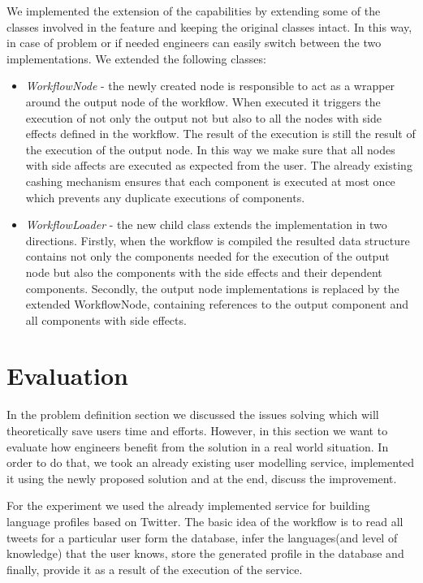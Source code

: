 We implemented the extension of the capabilities by extending some of the classes involved in the feature and keeping the original classes intact. In this way, in case of problem or if needed engineers can easily switch between the two implementations. We extended the following classes:

\begin{itemize}
	\item \textit{WorkflowNode} - the newly created node is responsible to act as a wrapper around the output node of the workflow. When executed it triggers the execution of not only the output not but also to all the nodes with side effects defined in the workflow. The result of the execution is still the result of the execution of the output node. In this way we make sure that all nodes with side affects are executed as expected from the user. The already existing cashing mechanism ensures that each component is executed at most once which prevents any duplicate executions of components.
	
	\item \textit{WorkflowLoader} - the new child class extends the implementation in two directions. Firstly, when the workflow is compiled the resulted data structure contains not only the components needed for the execution of the output node but also the components with the side effects and their dependent components. Secondly, the output node implementations is replaced by the extended WorkflowNode, containing references to the output component and all components with side effects.
\end{itemize}


\section{Evaluation} 

In the problem definition section we discussed the issues solving which will theoretically save users time and efforts. However,  in this section we want to evaluate how engineers benefit from the solution in a real world situation. In order to do that, we took an already existing user modelling service, implemented it using the newly proposed solution and at the end, discuss the improvement. 

For the experiment we used the already implemented service for building language profiles based on Twitter. The basic idea of the workflow is to read all tweets for a particular user form the database, infer the languages(and level of knowledge) that the user knows, store the generated profile in the database and finally, provide it as a result of the execution of the service.

